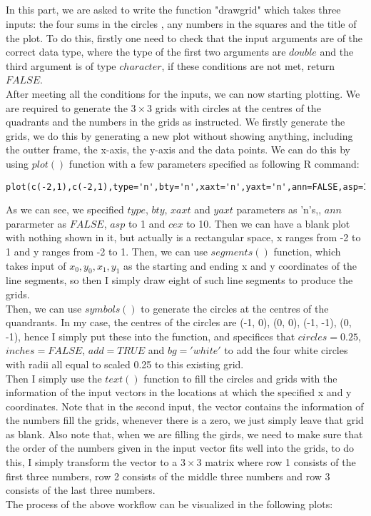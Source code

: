 \documentclass[12pt]{article}\usepackage[]{graphicx}\usepackage[]{color}
\begin{document}
\subsection{}
In this part, we are asked to write the function "drawgrid" which takes three inputs: the four sums in the circles , any numbers in the squares and the title of the plot. To do this, firstly one need to check that the input arguments are of the correct data type, where the type of the first two arguments are $double$ and the third argument is of type $character$, if these conditions are not met, return $FALSE$. \\
After meeting all the conditions for the inputs, we can now starting plotting. We are required to generate the $3\times 3$ grids with circles at the centres of the quadrants and the numbers in the grids as instructed. We firstly generate the grids, we do this by generating a new plot without showing anything, including the outter frame, the x-axis, the y-axis and the data points. We can do this by using $plot()$ function with a few parameters specified as following R command:
\begin{verbatim}
plot(c(-2,1),c(-2,1),type='n',bty='n',xaxt='n',yaxt='n',ann=FALSE,asp=1,cex=10)
\end{verbatim}
As we can see, we specified $type$, $bty$, $xaxt$ and $yaxt$ parameters as 'n's,, $ann$ pararmeter as $FALSE$, $asp$ to 1 and $cex$ to 10. Then we can have a blank plot with nothing shown in it, but actually is a rectangular space, x ranges from -2 to 1 and y ranges from -2 to 1. Then, we can use $segments()$ function, which takes input of $x_{0}, y_{0}, x_{1}, y_{1}$ as the starting and ending x and y coordinates of the line segments, so then I simply draw eight of such line segments to produce the grids.\\
Then, we can use $symbols()$ to generate the circles at the centres of the quandrants. In my case, the centres of the circles are (-1, 0), (0, 0), (-1, -1), (0, -1), hence I simply put these into the function, and specifices that $circles = 0.25$, $inches = FALSE$, $add = TRUE$ and $bg = 'white'$ to add the four white circles with radii all equal to scaled 0.25 to this existing grid. \\
Then I simply use the $text()$ function to fill the circles and grids with the information of the input vectors in the locations at which the specified x and y coordinates. Note that in the second input, the vector contains the information of the numbers fill the grids, whenever there is a zero, we just simply leave that grid as blank. Also note that, when we are filling the girds, we need to make sure that the order of the numbers given in the input vector fits well into the grids, to do this, I simply transform the vector to a $3\times 3$ matrix where row 1 consists of the first three numbers, row 2 consists of the middle three numbers and row 3 consists of the last three numbers.\\
The process of the above workflow can be visualized in the following plots:
 
\end{document}
